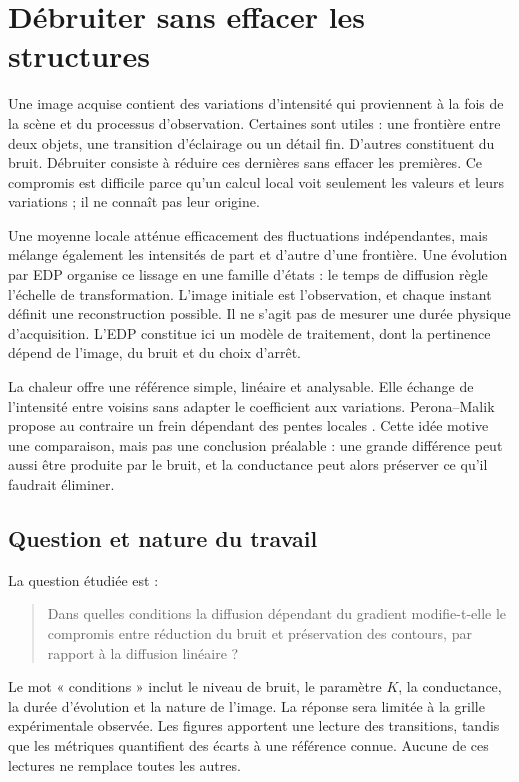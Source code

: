 \section{Débruiter sans effacer les structures}
\label{sec:context}

Une image acquise contient des variations d'intensité qui proviennent
à la fois de la scène et du processus d'observation. Certaines sont
utiles : une frontière entre deux objets, une transition d'éclairage
ou un détail fin. D'autres constituent du bruit. Débruiter consiste à
réduire ces dernières sans effacer les premières. Ce compromis est
difficile parce qu'un calcul local voit seulement les valeurs et leurs
variations ; il ne connaît pas leur origine.

Une moyenne locale atténue efficacement des fluctuations indépendantes,
mais mélange également les intensités de part et d'autre d'une frontière.
Une évolution par EDP organise ce lissage en une famille d'états : le
temps de diffusion règle l'échelle de transformation. L'image initiale
est l'observation, et chaque instant définit une reconstruction possible.
Il ne s'agit pas de mesurer une durée physique d'acquisition. L'EDP
constitue ici un modèle de traitement, dont la pertinence dépend de
l'image, du bruit et du choix d'arrêt.

La chaleur offre une référence simple, linéaire et analysable. Elle
échange de l'intensité entre voisins sans adapter le coefficient aux
variations. Perona--Malik propose au contraire un frein dépendant des
pentes locales \cite{perona1990}. Cette idée motive une comparaison,
mais pas une conclusion préalable : une grande différence peut aussi
être produite par le bruit, et la conductance peut alors préserver ce
qu'il faudrait éliminer.

\subsection{Question et nature du travail}
La question étudiée est :
\begin{quote}
Dans quelles conditions la diffusion dépendant du gradient modifie-t-elle
le compromis entre réduction du bruit et préservation des contours,
par rapport à la diffusion linéaire ?
\end{quote}
Le mot « conditions » inclut le niveau de bruit, le paramètre $K$, la
conductance, la durée d'évolution et la nature de l'image. La réponse
sera limitée à la grille expérimentale observée. Les figures apportent
une lecture des transitions, tandis que les métriques quantifient des
écarts à une référence connue. Aucune de ces lectures ne remplace toutes
les autres.

